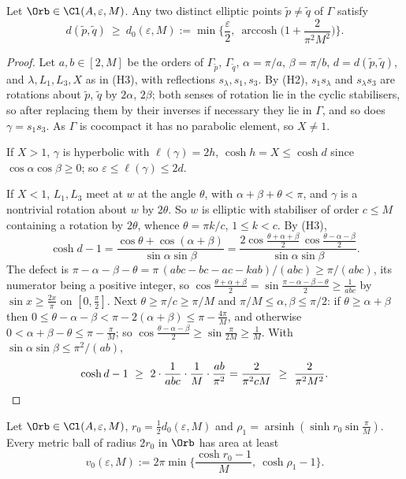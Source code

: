 \begin{lemma}\label{eig:sep}
Let $\Orb\in\Cl(A,\varepsilon,M)$. Any two distinct elliptic points $\tilde p\ne\tilde q$ of $\Gamma$ satisfy
\[
  d(\tilde p,\tilde q)\ \ge\ d_0(\varepsilon,M):=\min\Big\{\frac\varepsilon2,\ \operatorname{arccosh}\Big(1+\frac2{\pi^2M^2}\Big)\Big\}.
\]
\end{lemma}

\begin{proof}
Let $a,b\in[2,M]$ be the orders of $\Gamma_{\tilde p}$, $\Gamma_{\tilde q}$, $\alpha=\pi/a$, $\beta=\pi/b$, $d=d(\tilde p,\tilde q)$, and $\lambda,L_1,L_3,X$ as in (H3), with reflections $s_\lambda,s_1,s_3$. By (H2), $s_1s_\lambda$ and $s_\lambda s_3$ are rotations about $\tilde p$, $\tilde q$ by $2\alpha$, $2\beta$; both senses of rotation lie in the cyclic stabilisers, so after replacing them by their inverses if necessary they lie in $\Gamma$, and so does $\gamma=s_1s_3$. As $\Gamma$ is cocompact it has no parabolic element, so $X\ne1$.

If $X>1$, $\gamma$ is hyperbolic with $\ell(\gamma)=2h$, $\cosh h=X\le\cosh d$ since $\cos\alpha\cos\beta\ge0$; so $\varepsilon\le\ell(\gamma)\le2d$.

If $X<1$, $L_1,L_3$ meet at $w$ at the angle $\theta$, with $\alpha+\beta+\theta<\pi$, and $\gamma$ is a nontrivial rotation about $w$ by $2\theta$. So $w$ is elliptic with stabiliser of order $c\le M$ containing a rotation by $2\theta$, whence $\theta=\pi k/c$, $1\le k<c$. By (H3),
\[
  \cosh d-1=\frac{\cos\theta+\cos(\alpha+\beta)}{\sin\alpha\sin\beta}=\frac{2\cos\frac{\theta+\alpha+\beta}2\,\cos\frac{\theta-\alpha-\beta}2}{\sin\alpha\sin\beta}.
\]
The defect is $\pi-\alpha-\beta-\theta=\pi\,(abc-bc-ac-kab)/(abc)\ge\pi/(abc)$, its numerator being a positive integer, so $\cos\frac{\theta+\alpha+\beta}2=\sin\frac{\pi-\alpha-\beta-\theta}2\ge\frac1{abc}$ by $\sin x\ge\frac{2x}\pi$ on $[0,\frac\pi2]$. Next $\theta\ge\pi/c\ge\pi/M$ and $\pi/M\le\alpha,\beta\le\pi/2$: if $\theta\ge\alpha+\beta$ then $0\le\theta-\alpha-\beta<\pi-2(\alpha+\beta)\le\pi-\frac{4\pi}M$, and otherwise $0<\alpha+\beta-\theta\le\pi-\frac\pi M$; so $\cos\frac{\theta-\alpha-\beta}2\ge\sin\frac\pi{2M}\ge\frac1M$. With $\sin\alpha\sin\beta\le\pi^2/(ab)$,
\[
  \cosh d-1\ \ge\ 2\cdot\frac1{abc}\cdot\frac1M\cdot\frac{ab}{\pi^2}=\frac2{\pi^2cM}\ \ge\ \frac2{\pi^2M^2}.\qedhere
\]
\end{proof}

\begin{lemma}\label{eig:balls}
Let $\Orb\in\Cl(A,\varepsilon,M)$, $r_0=\frac12d_0(\varepsilon,M)$ and $\rho_1=\operatorname{arsinh}(\sinh r_0\sin\frac\pi M)$. Every metric ball of radius $2r_0$ in $\Orb$ has area at least
\[
  v_0(\varepsilon,M):=2\pi\min\Big\{\frac{\cosh r_0-1}M,\ \cosh\rho_1-1\Big\}.
\]
\end{lemma}

